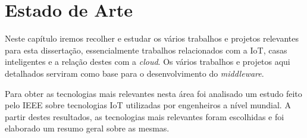 \chapter{Estado de Arte}

Neste capítulo iremos recolher e estudar os vários trabalhos e projetos relevantes para esta dissertação, essencialmente trabalhos relacionados com a IoT, casas inteligentes e a relação destes com a \textit{cloud}. Os vários trabalhos e projetos aqui detalhados serviram como base para o desenvolvimento do \textit{middleware}.

Para obter as tecnologias mais relevantes nesta área foi analisado um estudo \cite{ieeesurvey} feito pelo IEEE sobre tecnologias IoT utilizadas por engenheiros a nível mundial. A partir destes resultados, as tecnologias mais relevantes foram escolhidas e foi elaborado um resumo geral sobre as mesmas.



